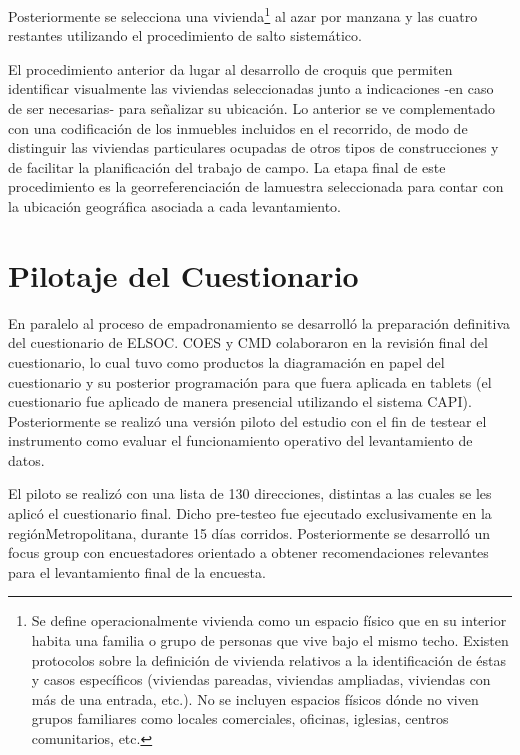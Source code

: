 \documentclass[
]{book}
\begin{document}
Posteriormente se selecciona una vivienda\footnote{Se define
  operacionalmente vivienda como un espacio físico que en su interior
  habita una familia o grupo de personas que vive bajo el mismo techo.
  Existen protocolos sobre la definición de vivienda relativos a la
  identificación de éstas y casos específicos (viviendas pareadas,
  viviendas ampliadas, viviendas con más de una entrada, etc.). No se
  incluyen espacios físicos dónde no viven grupos familiares como
  locales comerciales, oficinas, iglesias, centros comunitarios, etc.}
al azar por manzana y las cuatro restantes utilizando el procedimiento
de salto sistemático.

El procedimiento anterior da lugar al desarrollo de croquis que permiten
identificar visualmente las viviendas seleccionadas junto a indicaciones
-en caso de ser necesarias- para señalizar su ubicación. Lo anterior se
ve complementado con una codificación de los inmuebles incluidos en el
recorrido, de modo de distinguir las viviendas particulares ocupadas de
otros tipos de construcciones y de facilitar la planificación del
trabajo de campo. La etapa final de este procedimiento es la
georreferenciación de lamuestra seleccionada para contar con la
ubicación geográfica asociada a cada levantamiento.

\hypertarget{pilotaje-del-cuestionario}{%
\section{Pilotaje del Cuestionario}\label{pilotaje-del-cuestionario}}

En paralelo al proceso de empadronamiento se desarrolló la preparación
definitiva del cuestionario de ELSOC. COES y CMD colaboraron en la
revisión final del cuestionario, lo cual tuvo como productos la
diagramación en papel del cuestionario y su posterior programación para
que fuera aplicada en tablets (el cuestionario fue aplicado de manera
presencial utilizando el sistema CAPI). Posteriormente se realizó una
versión piloto del estudio con el fin de testear el instrumento como
evaluar el funcionamiento operativo del levantamiento de datos.

El piloto se realizó con una lista de 130 direcciones, distintas a las
cuales se les aplicó el cuestionario final. Dicho pre-testeo fue
ejecutado exclusivamente en la regiónMetropolitana, durante 15 días
corridos. Posteriormente se desarrolló un focus group con encuestadores
orientado a obtener recomendaciones relevantes para el levantamiento
final de la encuesta.
\end{document}
